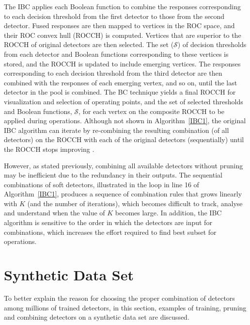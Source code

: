 



The IBC applies each Boolean function to combine the responses corresponding to each decision threshold from the first detector to those from the second detector.
Fused responses are then mapped to vertices in the ROC space, and their ROC convex hull (ROCCH) is computed.
Vertices that are superior to the ROCCH of original detectors are then selected.
The set ($\mathcal{S}$) of decision thresholds from each detector and Boolean functions corresponding to these vertices is stored, and the ROCCH is updated to include emerging vertices.
The responses corresponding to each decision threshold from the third detector are then combined with the responses of each emerging vertex, and so on, until the last detector in the pool is combined.
The BC technique yields a final ROCCH for visualization and selection of operating points, and the set of selected thresholds and Boolean functions, $\mathcal{S}$, for each vertex on the composite ROCCH to be applied during operations.
Although not shown in Algorithm~\ref{IBC1}, the original IBC algorithm can iterate by re-combining the resulting combination (of all detectors) on the ROCCH with each of the original detectors (sequentially) until the ROCCH stops improving \cite{Khreich2010-ICPR}.

However, as stated previously, combining all available detectors without pruning may be inefficient due to the redundancy in their outputs.
The sequential combinations of soft detectors, illustrated in the loop in line 16 of Algorithm~\ref{IBC1}, produces a sequence of combination rules that grows linearly with $K$ (and the number of iterations), which becomes difficult to track, analyse and understand when the value of $K$ becomes large.
In addition, the IBC algorithm is sensitive to the order in which the detectors are input for combinations, which increases the effort required to find best subset for operations.

 \section{Synthetic Data Set}
\label{sec:synthetic}
To better explain the reason for choosing the proper combination of detectors among millions of trained detectors, in this section, examples of training, pruning and combining detectors on a synthetic data set are discussed. 

